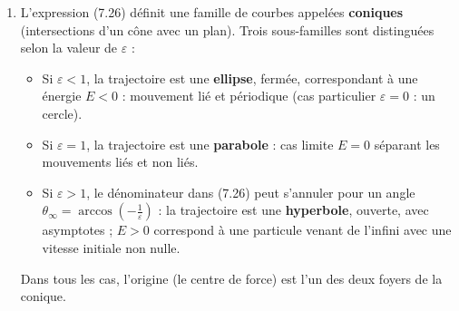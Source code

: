 \documentclass[a4paper,10pt]{report}
\begin{document}
\begin{enumerate}
	 \item
	 
	 L'expression (7.26) définit une famille de courbes appelées \textbf{coniques} (intersections d’un cône avec un plan). Trois sous-familles sont distinguées selon la valeur de $\varepsilon$ :
	 
	 \begin{itemize}
	 	\item Si $\varepsilon < 1$, la trajectoire est une \textbf{ellipse}, fermée, correspondant à une énergie $E < 0$ : mouvement lié et périodique (cas particulier $\varepsilon = 0$ : un cercle).
	 	\item Si $\varepsilon = 1$, la trajectoire est une \textbf{parabole} : cas limite $E = 0$ séparant les mouvements liés et non liés.
	 	\item Si $\varepsilon > 1$, le dénominateur dans (7.26) peut s'annuler pour un angle $\theta_\infty = \arccos\left(-\frac{1}{\varepsilon}\right)$ : la trajectoire est une \textbf{hyperbole}, ouverte, avec asymptotes ; $E > 0$ correspond à une particule venant de l'infini avec une vitesse initiale non nulle.
	 \end{itemize}
	 
	 Dans tous les cas, l’origine (le centre de force) est l’un des deux foyers de la conique.
	 
	 
\end{enumerate}
\end{document}

